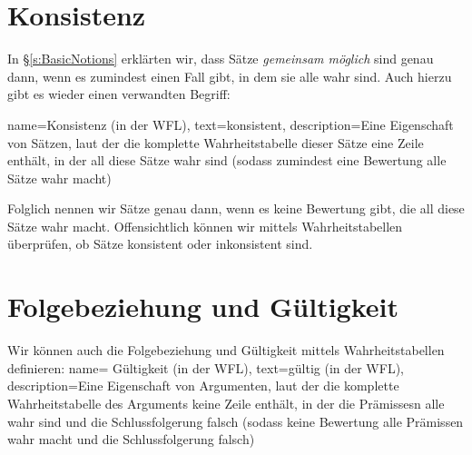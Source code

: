 \section{Konsistenz}
In \S\ref{s:BasicNotions} erklärten wir, dass Sätze \emph{gemeinsam möglich} sind genau dann, wenn es zumindest einen Fall gibt, in dem sie alle wahr sind. Auch hierzu gibt es wieder einen verwandten Begriff:

{
  name=Konsistenz (in der WFL),
  text=konsistent,
description={Eine Eigenschaft von Sätzen, laut der die \gls{komplette Wahrheitstabelle} dieser Sätze eine Zeile enthält, in der all diese Sätze wahr sind (sodass zumindest eine \gls{Bewertung} alle Sätze wahr macht)}
}

Folglich nennen wir Sätze  genau dann, wenn es keine Bewertung gibt, die all diese Sätze wahr macht. Offensichtlich können wir mittels Wahrheitstabellen überprüfen, ob Sätze konsistent oder inkonsistent sind.

\section{Folgebeziehung und Gültigkeit}
Wir können auch die Folgebeziehung und Gültigkeit mittels Wahrheitstabellen definieren:
{
  name= Gültigkeit (in der WFL),
  text=gültig (in der WFL),
description={Eine Eigenschaft von Argumenten, laut der die \gls{komplette Wahrheitstabelle} des Arguments keine Zeile enthält, in der die \glspl{Prämisse}n alle wahr sind und die \gls{Schlussfolgerung} falsch (sodass keine \gls{Bewertung} alle Prämissen wahr macht und die Schlussfolgerung falsch)}
}

